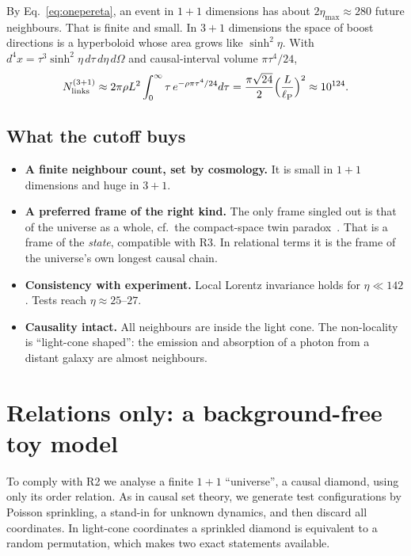 \documentclass[11pt,a4paper]{article}
\newcommand{\lP}{\ell_{\mathrm P}}
\begin{document}
By Eq.~\eqref{eq:onepereta}, an event in $1+1$ dimensions has about $2\eta_{\max}\approx280$ future neighbours. That is finite and small. In $3+1$ dimensions the space of boost directions is a hyperboloid whose area grows like $\sinh^2\eta$. With $d^4x=\tau^3\sinh^2\!\eta\,d\tau\,d\eta\,d\Omega$ and causal-interval volume $\pi\tau^4/24$,
\begin{equation}
N^{(3+1)}_{\rm links}\approx2\pi\rho L^2\int_0^\infty\tau\,e^{-\rho\pi\tau^4/24}d\tau=\frac{\pi\sqrt{24}}{2}\Big(\frac{L}{\lP}\Big)^2\approx10^{124}.
\end{equation}

\subsection{What the cutoff buys}
\begin{itemize}[leftmargin=*,itemsep=2pt]
\item \textbf{A finite neighbour count, set by cosmology.} It is small in $1+1$ dimensions and huge in $3+1$.
\item \textbf{A preferred frame of the right kind.} The only frame singled out is that of the universe as a whole, cf.\ the compact-space twin paradox~\cite{BarrowLevin01}. That is a frame of the \emph{state}, compatible with R3. In relational terms it is the frame of the universe's own longest causal chain.
\item \textbf{Consistency with experiment.} Local Lorentz invariance holds for $\eta\ll142$. Tests reach $\eta\approx25$--$27$.
\item \textbf{Causality intact.} All neighbours are inside the light cone. The non-locality is ``light-cone shaped'': the emission and absorption of a photon from a distant galaxy are almost neighbours.
\end{itemize}

\section{Relations only: a background-free toy model}
To comply with R2 we analyse a finite $1+1$ ``universe'', a causal diamond, using only its order relation. As in causal set theory, we generate test configurations by Poisson sprinkling, a stand-in for unknown dynamics, and then discard all coordinates. In light-cone coordinates a sprinkled diamond is equivalent to a random permutation, which makes two exact statements available.
\end{document}
